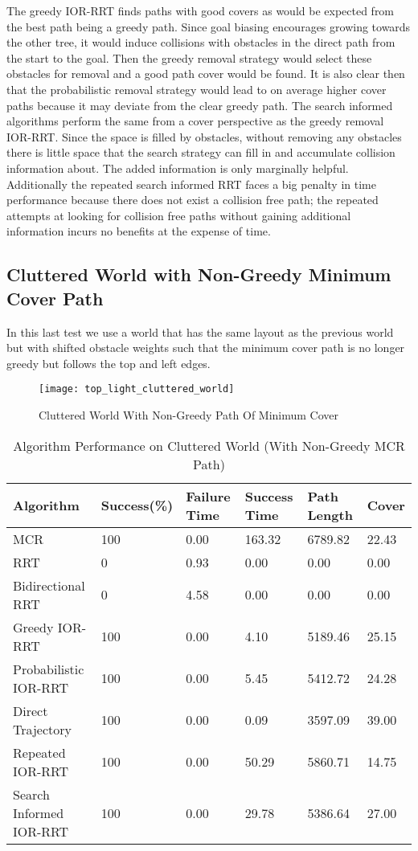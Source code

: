 The greedy IOR-RRT finds paths with good covers as would be expected from the best path being a greedy path. Since goal biasing encourages growing towards the other tree, it would induce collisions with obstacles in the direct path from the start to the goal. Then the greedy removal strategy would select these obstacles for removal and a good path cover would be found. It is also clear then that the probabilistic removal strategy would lead to on average higher cover paths because it may deviate from the clear greedy path. The search informed algorithms perform the same from a cover perspective as the greedy removal IOR-RRT. Since the space is filled by obstacles, without removing any obstacles there is little space that the search strategy can fill in and accumulate collision information about. The added information is only marginally helpful. Additionally the repeated search informed RRT faces a big penalty in time performance because there does not exist a collision free path; the repeated attempts at looking for collision free paths without gaining additional information incurs no benefits at the expense of time.


\subsection{Cluttered World with Non-Greedy Minimum Cover Path}
In this last test we use a world that has the same layout as the previous world but with shifted obstacle weights such that the minimum cover path is no longer greedy but follows the top and left edges. 

\begin{figure}[h!]
    \centering
    \texttt{[image: top\_light\_cluttered\_world]}
    \caption{Cluttered World With Non-Greedy Path Of Minimum Cover}
    \label{fig:top_light_cluttered_world}
\end{figure}

\begin{table}[h!]
\begin{tabular}{@{}llllll@{}}
\toprule
Algorithm & Success(\%)  & Failure Time  & Success Time  & Path Length & Cover\\ 
\midrule
MCR & 100 & 0.00 & 163.32 & 6789.82 & 22.43 \\
RRT & 0 & 0.93 & 0.00 & 0.00 & 0.00 \\
Bidirectional RRT & 0 & 4.58 & 0.00 & 0.00 & 0.00 \\
Greedy IOR-RRT & 100 & 0.00 & 4.10 & 5189.46 & 25.15 \\
Probabilistic IOR-RRT & 100 & 0.00 & 5.45 & 5412.72 & 24.28 \\
Direct Trajectory & 100 & 0.00 & 0.09 & 3597.09 & 39.00 \\
Repeated IOR-RRT & 100 & 0.00 & 50.29 & 5860.71 & 14.75 \\
Search Informed IOR-RRT & 100 & 0.00 & 29.78 & 5386.64 & 27.00 \\
\bottomrule
\end{tabular}
\caption{Algorithm Performance on Cluttered World (With Non-Greedy MCR Path)}
\label{tab:top_light_cluttered_world}
\end{table}

